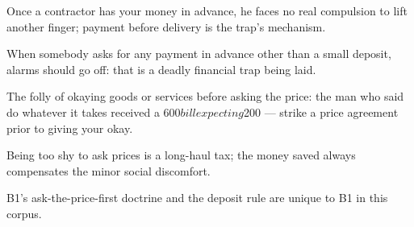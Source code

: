 

\begin{distilled}
  \item Once a contractor has your money in advance, he faces no real compulsion to lift another finger; payment before delivery is the trap's mechanism.
  \item When somebody asks for any payment in advance other than a small deposit, alarms should go off: that is a deadly financial trap being laid.
  \item The folly of okaying goods or services before asking the price: the man who said do whatever it takes received a $600 bill expecting $200 --- strike a price agreement prior to giving your okay.
  \item Being too shy to ask prices is a long-haul tax; the money saved always compensates the minor social discomfort.
\end{distilled}
\begin{unique}
  \item B1's ask-the-price-first doctrine and the deposit rule are unique to B1 in this corpus.
\end{unique}
